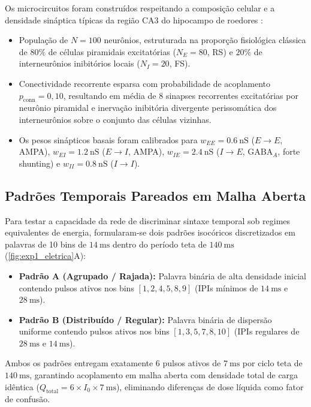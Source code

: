 \documentclass[12pt,openright,oneside,a4paper,brazil]{abntex2}
\begin{document}
Os microcircuitos foram construídos respeitando a composição celular e a densidade sináptica típicas da região CA3 do hipocampo de roedores \cite{buzsaki2006, kandel2021}:
\begin{itemize}
    \item População de $N = 100$ neurônios, estruturada na proporção fisiológica clássica de $80\%$ de células piramidais excitatórias ($N_E = 80$, RS) e $20\%$ de interneurônios inibitórios locais ($N_I = 20$, FS).
    \item Conectividade recorrente esparsa com probabilidade de acoplamento $p_{\text{conn}} = 0{,}10$, resultando em média de 8 sinapses recorrentes excitatórias por neurônio piramidal e inervação inibitória divergente perissomática dos interneurônios sobre o conjunto das células vizinhas.
    \item Os pesos sinápticos basais foram calibrados para $w_{EE} = \qty{0.6}{\nano\siemens}$ ($E \to E$, AMPA), $w_{EI} = \qty{1.2}{\nano\siemens}$ ($E \to I$, AMPA), $w_{IE} = \qty{2.4}{\nano\siemens}$ ($I \to E$, $\text{GABA}_A$, forte shunting) e $w_{II} = \qty{0.8}{\nano\siemens}$ ($I \to I$).
\end{itemize}

\subsection{Padrões Temporais Pareados em Malha Aberta}
Para testar a capacidade da rede de discriminar sintaxe temporal sob regimes equivalentes de energia, formularam-se dois padrões isocóricos discretizados em palavras de 10 bins de $\qty{14}{\milli\second}$ dentro do período teta de $\qty{140}{\milli\second}$ (\cref{fig:exp1_eletrica}A):
\begin{itemize}
    \item \textbf{Padrão A (Agrupado / Rajada):} Palavra binária de alta densidade inicial contendo pulsos ativos nos bins $[1, 2, 4, 5, 8, 9]$ (IPIs mínimos de $\qty{14}{\milli\second}$ e $\qty{28}{\milli\second}$).
    \item \textbf{Padrão B (Distribuído / Regular):} Palavra binária de dispersão uniforme contendo pulsos ativos nos bins $[1, 3, 5, 7, 8, 10]$ (IPIs regulares de $\qty{28}{\milli\second}$ e $\qty{14}{\milli\second}$).
\end{itemize}
Ambos os padrões entregam exatamente 6 pulsos ativos de $\qty{7}{\milli\second}$ por ciclo teta de $\qty{140}{\milli\second}$, garantindo acoplamento em malha aberta com densidade total de carga idêntica ($Q_{\text{total}} = 6 \times I_0 \times \qty{7}{\milli\second}$), eliminando diferenças de dose líquida como fator de confusão.
\end{document}
